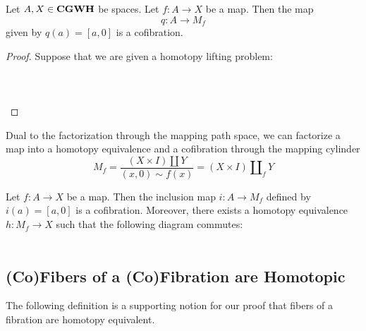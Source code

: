 \documentclass[a4paper]{article}
\begin{document}
\begin{prp}{}{} Let $A,X\in\bold{CGWH}$ be spaces. Let $f:A\to X$ be a map. Then the map $$q:A\to M_f$$ given by $q(a)=[a,0]$ is a cofibration. \tcbline
\begin{proof}
Suppose that we are given a homotopy lifting problem: \\~\\
\\~\\
\end{proof}
\end{prp}

Dual to the factorization through the mapping path space, we can factorize a map into a homotopy equivalence and a cofibration through the mapping cylinder $$M_f=\frac{(X\times I)\amalg Y}{(x,0)\sim f(x)}=(X\times I)\amalg_fY$$

\begin{thm}{}{} Let $f:A\to X$ be a map. Then the inclusion map $i:A\to M_f$ defined by $i(a)=[a,0]$ is a cofibration. Moreover, there exists a homotopy equivalence $h:M_f\to X$ such that the following diagram commutes: \\~\\
\end{thm}

\subsection{(Co)Fibers of a (Co)Fibration are Homotopic}
The following definition is a supporting notion for our proof that fibers of a fibration are homotopy equivalent. 
\end{document}
